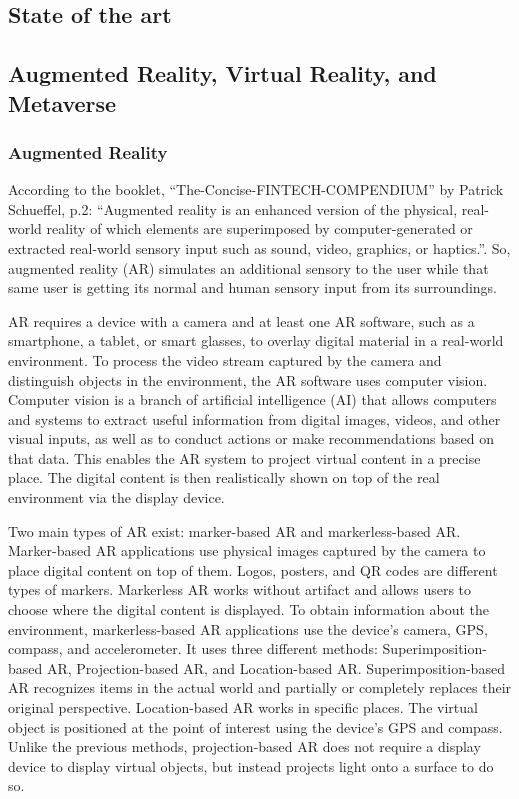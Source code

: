 \documentclass[12pt, a4paper]{article}
\begin{document}
\begin{multicols}{2}
\section{State of the art}

\subsection{Augmented Reality, Virtual Reality, and Metaverse}

\subsubsection{Augmented Reality}

\par According to the booklet, “The-Concise-FINTECH-COMPENDIUM” by Patrick Schueffel, p.2: “Augmented reality is an enhanced version of the physical, real-world reality of which elements are superimposed by computer-generated or extracted real-world sensory input such as sound, video, graphics, or haptics.”\cite{AR_def}. So, augmented reality (AR) simulates an additional sensory to the user while that same user is getting its normal and human sensory input from its surroundings.\cite{augmentReal}
\par AR requires a device with a camera and at least one AR software, such as a smartphone, a tablet, or smart glasses, to overlay digital material in a real-world environment. To process the video stream captured by the camera and distinguish objects in the environment, the AR software uses computer vision. Computer vision is a branch of artificial intelligence (AI) that allows computers and systems to extract useful information from digital images, videos, and other visual inputs, as well as to conduct actions or make recommendations based on that data. This enables the AR system to project virtual content in a precise place. The digital content is then realistically shown on top of the real environment via the display device.\cite{metaverse2}
\par Two main types of AR exist: marker-based AR and markerless-based AR. Marker-based AR applications use physical images captured by the camera to place digital content on top of them. Logos, posters, and QR codes are different types of markers. Markerless AR works without artifact and allows users to choose where the digital content is displayed. To obtain information about the environment, markerless-based AR applications use the device's camera, GPS, compass, and accelerometer. It uses three different methods: Superimposition-based AR, Projection-based AR, and Location-based AR. Superimposition-based AR recognizes items in the actual world and partially or completely replaces their original perspective. Location-based AR works in specific places. The virtual object is positioned at the point of interest using the device's GPS and compass. Unlike the previous methods, projection-based AR does not require a display device to display virtual objects, but instead projects light onto a surface to do so.\cite{metaverse2}


\end{multicols}
\end{document}
